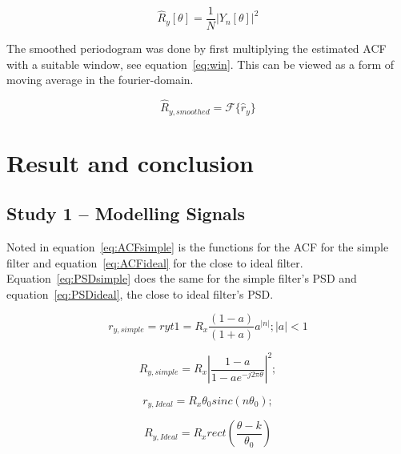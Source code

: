 \documentclass[10pt]{article}
\begin{document}
\begin{equation}
\label{eq:Peri}
\hat{R}_y[\theta] = \frac{1}{N}|Y_n[\theta]|^2
\end{equation}


The smoothed periodogram was done by first multiplying the estimated ACF with a
 suitable window, see equation~\ref{eq:win}. This can be viewed as a form of moving average in the fourier-domain.

 \begin{equation}
 \label{eq:win}
 \hat{R}_{y,smoothed} = \mathcal{F}\{\hat{r}_y\}
 \end{equation}


\section{Result and conclusion}
\subsection{Study 1 – Modelling Signals}

Noted in equation~\ref{eq:ACFsimple} is the functions for the ACF
for the simple filter and equation~\ref{eq:ACFideal} for the close to ideal filter.
Equation~\ref{eq:PSDsimple} does the same for the simple filter's PSD
and equation~\ref{eq:PSDideal}, the close to ideal filter's PSD.

\begin{equation}
  \label{eq:ACFsimple}
  r_{y,simple} = ryt1 = R_x\frac{(1-a)}{(1+a)}a^{|n|};  |a| < 1
\end{equation}

\begin{equation}
  \label{eq:PSDsimple}
  R_{y,simple} =  R_x|\frac{1-a}{1-ae^{-j2\pi\theta}}|^2;
\end{equation}

\begin{equation}
  \label{eq:ACFideal}
  r_{y,Ideal} = R_x\theta_{0}sinc(n\theta_0);
\end{equation}

\begin{equation}
  \label{eq:PSDideal}
  R_{y,Ideal} = R_xrect(\frac{\theta - k}{\theta_0})
\end{equation}
\clearpage
\end{document}
